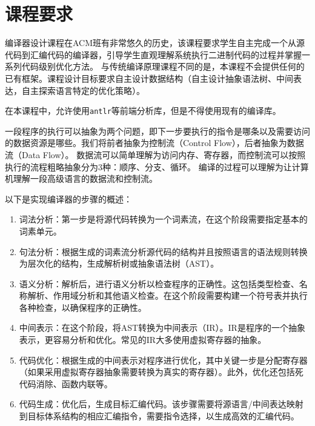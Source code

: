 \chapter{课程要求}

编译器设计课程在ACM班有非常悠久的历史，该课程要求学生自主完成一个从源代码到汇编代码的编译器，引导学生直观理解系统执行二进制代码的过程并掌握一系列代码级别优化方法。
与传统编译原理课程不同的是，本课程不会提供任何的已有框架。课程设计目标要求自主设计数据结构（自主设计抽象语法树、中间表达，自主探索语言特定的优化策略）。

\begin{remark}
    在本课程中，允许使用\texttt{antlr}等前端分析库，但是不得使用现有的编译库。
\end{remark}

一段程序的执行可以抽象为两个问题，即下一步要执行的指令是哪条以及需要访问的数据资源是哪些。我们将前者抽象为控制流（Control Flow），后者抽象为数据流（Data Flow）。
数据流可以简单理解为访问内存、寄存器，而控制流可以按照执行的流程粗略抽象分为3种：顺序、分支、循环。
编译的过程可以理解为让计算机理解一段高级语言的数据流和控制流。

以下是实现编译器的步骤的概述：

\begin{enumerate}
    \item 词法分析：第一步是将源代码转换为一个词素流，在这个阶段需要指定基本的词素单元。
    \item 句法分析：根据生成的词素流分析源代码的结构并且按照语言的语法规则转换为层次化的结构，生成解析树或抽象语法树（AST）。
    \item 语义分析：解析后，进行语义分析以检查程序的正确性。这包括类型检查、名称解析、作用域分析和其他语义检查。在这个阶段需要构建一个符号表并执行各种检查，以确保程序的正确性。
    \item 中间表示：在这个阶段，将AST转换为中间表示（IR）。IR是程序的一个抽象表示，更容易分析和优化。常见的IR大多使用虚拟寄存器的抽象。
    \item 代码优化：根据生成的中间表示对程序进行优化，其中关键一步是分配寄存器（如果采用虚拟寄存器抽象需要转换为真实的寄存器）。此外，优化还包括死代码消除、函数内联等。
    \item 代码生成：优化后，生成目标汇编代码。该步骤需要将源语言/中间表达映射到目标体系结构的相应汇编指令，需要指令选择，以生成高效的汇编代码。
\end{enumerate}


